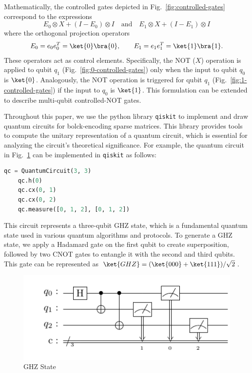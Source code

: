 \documentclass{article}
\begin{document}
Mathematically, the controlled gates depicted in Fig.~\ref{fig:controlled-gates} correspond to the expressions
\begin{equation}
  E_0 \otimes X + (I - E_0) \otimes I \quad \text{and} \quad E_1 \otimes X + (I - E_1) \otimes I
\end{equation}
where the orthogonal projection operators
\begin{equation}
  E_0 = e_0 e_0^T = \ket{0} \bra{0}, \qquad E_1 = e_1 e_1^T = \ket{1}\bra{1}.
\end{equation}
These operators act as control elements.
Specifically, the NOT ($X$) operation is applied to qubit $q_1$ (Fig.~\ref{fig:0-controlled-gates}) only when the input to qubit $q_0$ is $\ket{0}$. Analogously, the NOT operation is triggered for qubit $q_1$ (Fig.~\ref{fig:1-controlled-gates}) if the input to $q_0$ is $\ket{1}$.
This formulation can be extended to describe multi-qubit controlled-NOT gates.

Throughout this paper, we use the python library \texttt{qiskit} \cite{wille2019ibm} to implement and draw quantum circuits for bolck-encoding sparse matrices.
This library provides tools to compute the unitary representation of a quantum circuit, which is essential for analyzing the circuit's theoretical significance.
For example, the quantum circuit in Fig.~\ref{fig:circuit1} can be implemented in \texttt{qiskit} as follows:

    \begin{lstlisting}[language=Python, label={lst:ghz-circuit}]
    qc = QuantumCircuit(3, 3)
    qc.h(0)
    qc.cx(0, 1)
    qc.cx(0, 2)
    qc.measure([0, 1, 2], [0, 1, 2])
    \end{lstlisting}

This circuit represents a three-qubit GHZ state, which is a fundamental quantum state used in various quantum algorithms and protocols.
To generate a GHZ state, we apply a Hadamard gate on the first qubit to create superposition, followed by two CNOT gates to entangle it with the second and third qubits.
This gate can be represented as $\ket{GHZ} = (\ket{000}+\ket{111})/\sqrt{2}$.

\begin{figure}[htbp]
  \centering
  \includegraphics{pdf/example}
  \caption{
    GHZ State
  }
  \label{fig:circuit1}
\end{figure}
\end{document}
